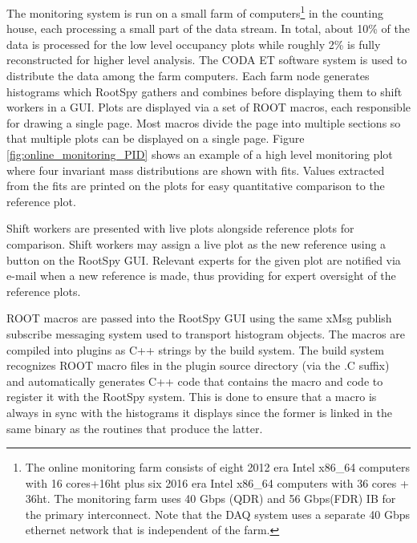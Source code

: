 The monitoring system is run on a small farm of computers\footnote{The online monitoring farm consists of eight 2012 era Intel x86\_64 computers with 16 cores+16ht plus six 2016 era Intel x86\_64 computers with 36 cores + 36ht. The monitoring farm uses 40 Gbps (QDR) and 56 Gbps(FDR) IB for the primary interconnect. Note that the DAQ system uses a separate 40 Gbps ethernet network that is independent of the farm.} in the counting house, each processing a small part of the data stream. In total, about 10\% of the data is processed for the low level occupancy plots while roughly 2\% is fully reconstructed for higher level analysis. The CODA ET software system is used to distribute the data among the farm computers. Each farm node generates histograms which RootSpy gathers and combines before displaying them to shift workers in a GUI.
Plots are displayed via a set of ROOT macros, each responsible for drawing a single page. Most macros divide the page into multiple sections so that multiple plots can be displayed on a single page. Figure \ref{fig:online_monitoring_PID} shows an example of a high level monitoring plot where four invariant mass distributions are shown with fits. Values extracted from the fits are printed on the plots for easy quantitative comparison to the reference plot. 

Shift workers are presented with live plots alongside reference plots for comparison. Shift workers may assign a live plot as the new reference using a button on the RootSpy GUI. Relevant experts for the given plot are notified via e-mail when a new reference is made, thus providing for expert oversight of the reference plots.

ROOT macros are passed into the RootSpy GUI using the same xMsg\cite{xmsg} publish subscribe messaging system used to transport histogram objects. The macros are compiled into plugins as C++ strings by the build system. The build system recognizes ROOT macro files in the plugin source directory (via the .C suffix) and automatically generates C++ code that contains the macro and code to register it with the RootSpy system. This is done to ensure that a macro is always in sync with the histograms it displays since the former is linked in the same binary as the routines that produce the latter.

